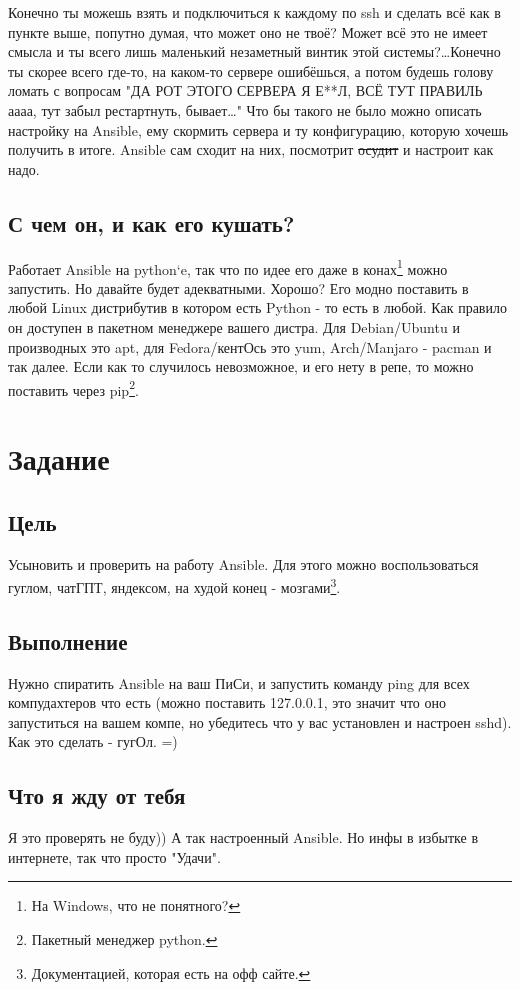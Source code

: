             Конечно ты можешь взять и подключиться к каждому по ssh и сделать всё как в пункте выше, попутно думая, что может оно не твоё? Может всё это не имеет смысла и ты всего лишь маленький незаметный винтик этой системы?\dots Конечно ты скорее всего где-то, на каком-то сервере ошибёшься, а потом будешь голову ломать с вопросам "ДА РОТ ЭТОГО СЕРВЕРА Я Е**Л, ВСЁ ТУТ ПРАВИЛЬ аааа, тут забыл рестартнуть, бывает\dots" Что бы такого не было можно описать настройку на Ansible, ему скормить сервера и ту конфигурацию, которую хочешь получить в итоге. Ansible сам сходит на них, посмотрит \sout{осудит} и настроит как надо.

        \subsection{С чем он, и как его кушать?}
            Работает Ansible на python`e, так что по идее его даже в конах\footnote{На Windows, что не понятного?} можно запустить. Но давайте будет адекватными. Хорошо? Его модно поставить в любой Linux дистрибутив в котором есть Python - то есть в любой. Как правило он доступен в пакетном менеджере вашего дистра. Для Debian/Ubuntu и производных это apt, для Fedora/кентОсь это yum, Arch/Manjaro - pacman и так далее. Если как то случилось невозможное, и его нету в репе, то можно поставить через pip\footnote{Пакетный менеджер python.}.

    \section{Задание}

        \subsection{Цель}
            Усыновить и проверить на работу Ansible. Для этого можно воспользоваться гуглом, чатГПТ, яндексом, на худой конец - мозгами\footnote{Документацией, которая есть на офф сайте.}.

        \subsection{Выполнение}
            Нужно спиратить Ansible на ваш ПиСи, и запустить команду ping для всех компудахтеров что есть (можно поставить 127.0.0.1, это значит что оно запуститься на вашем компе, но убедитесь что у вас установлен и настроен sshd). Как это сделать - гугОл. =)

        \subsection{Что я жду от тебя}
            Я это проверять не буду)) А так настроенный Ansible. Но инфы в избытке в интернете, так что просто "Удачи".


